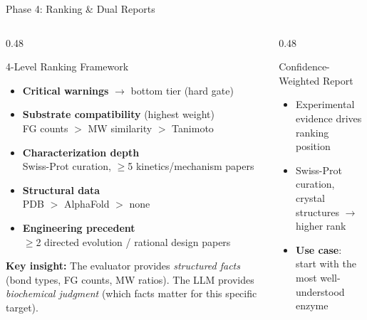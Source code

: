 \documentclass[aspectratio=169, 11pt]{beamer}
\begin{document}
\begin{frame}{Phase 4: Ranking \& Dual Reports}
\vspace{-6pt}
\begin{columns}[T]
\begin{column}{0.48\textwidth}

\begin{block}{\small 4-Level Ranking Framework}
\vspace{-2pt}
\begin{itemize}\scriptsize
\setlength\itemsep{2pt}
\item[\textbf{P0.}] {\color{accentred}\textbf{Critical warnings}} $\rightarrow$ bottom tier (hard gate)
\item[\textbf{P1.}] \textbf{Substrate compatibility} (highest weight)\\
  {\tiny FG counts $>$ MW similarity $>$ Tanimoto}
\item[\textbf{P2.}] \textbf{Characterization depth}\\
  {\tiny Swiss-Prot curation, $\geq$5 kinetics/mechanism papers}
\item[\textbf{P3.}] \textbf{Structural data}\\
  {\tiny PDB $>$ AlphaFold $>$ none}
\item[\textbf{P4.}] \textbf{Engineering precedent}\\
  {\tiny $\geq$2 directed evolution / rational design papers}
\end{itemize}
\end{block}

\vspace{2pt}
\colorbox{lightblue!50}{\parbox{0.92\textwidth}{\centering
\scriptsize\textbf{Key insight:} The evaluator provides \textit{structured facts} (bond types, FG counts, MW ratios). The LLM provides \textit{biochemical judgment} (which facts matter for this specific target).
}}

\end{column}
\begin{column}{0.48\textwidth}

\begin{block}{\small Confidence-Weighted Report}
\vspace{-2pt}
\begin{itemize}\scriptsize
\setlength\itemsep{1pt}
\item Experimental evidence drives ranking position
\item Swiss-Prot curation, crystal structures $\rightarrow$ higher rank
\item \textbf{Use case}: start with the most well-understood enzyme
\end{itemize}
\end{block}


\end{column}
\end{columns}
\end{frame}
\end{document}
